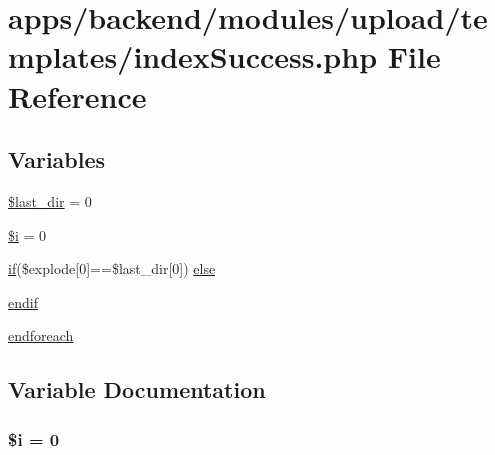 \hypertarget{backend_2modules_2upload_2templates_2index_success_8php}{\section{apps/backend/modules/upload/templates/index\-Success.php File Reference}
\label{backend_2modules_2upload_2templates_2index_success_8php}
}
\subsection*{Variables}
\begin{DoxyCompactItemize}
\item 
\hyperlink{backend_2modules_2upload_2templates_2index_success_8php_aea10e97c4d2e4095f9cd37492de6b726}{\$last\-\_\-dir} = 0
\item 
\hyperlink{backend_2modules_2upload_2templates_2index_success_8php_a83018d9153d17d91fbcf3bc10158d34f}{\$i} = 0
\item 
\hyperlink{live_2modules_2tournament_2templates_2__form_team_8php_ae30a307b320d8da5d9a945eaf68f7549}{if}(\$explode\mbox{[}0\mbox{]}==\$last\-\_\-dir\mbox{[}0\mbox{]}) \hyperlink{backend_2modules_2upload_2templates_2index_success_8php_a56aae000e1e86b417378157b74c696c7}{else}
\item 
\hyperlink{backend_2modules_2upload_2templates_2index_success_8php_adc32cd369c6cac488622fdb39154192b}{endif}
\item 
\hyperlink{backend_2modules_2upload_2templates_2index_success_8php_a672d9707ef91db026c210f98cc601123}{endforeach}
\end{DoxyCompactItemize}


\subsection{Variable Documentation}
\hypertarget{backend_2modules_2upload_2templates_2index_success_8php_a83018d9153d17d91fbcf3bc10158d34f}{
\subsubsection[{\$i}]{\setlength{\rightskip}{0pt plus 5cm}\${\bf i} = 0}}\label{backend_2modules_2upload_2templates_2index_success_8php_a83018d9153d17d91fbcf3bc10158d34f}


